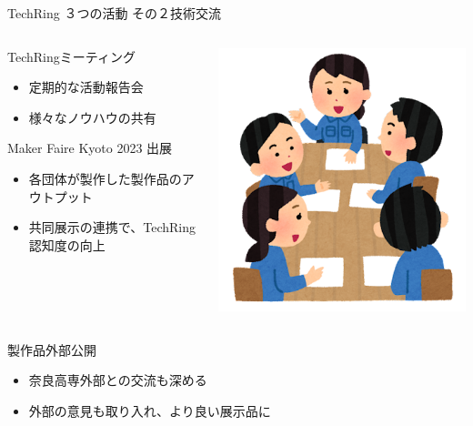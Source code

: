 \documentclass[dvipdfmx]{beamer}
\begin{document}
\begin{frame}{TechRing ３つの活動 その２}{技術交流}

  \begin{columns}[totalwidth=\textwidth]
    \begin{column}{0.76\textwidth}
      \begin{alertblock}{TechRingミーティング}
        \begin{itemize}
          \item 定期的な活動報告会
          \item 様々なノウハウの共有
        \end{itemize}
      \end{alertblock}
    
      \begin{alertblock}{Maker Faire Kyoto 2023 出展}
          \begin{itemize}
            \item 各団体が製作した製作品のアウトプット
            \item 共同展示の連携で、TechRing認知度の向上
          \end{itemize}
      \end{alertblock}
    \end{column}

    \begin{column}{0.2\textwidth}
      \begin{center}
        \includegraphics[scale=.18]{pic/discuss.png}
      \end{center}
    \end{column}
  \end{columns}

  \begin{block}{製作品外部公開}
    \begin{itemize}
      \item 奈良高専外部との交流も深める
      \item 外部の意見も取り入れ、より良い展示品に
    \end{itemize}
  \end{block}
\end{frame}
\end{document}
